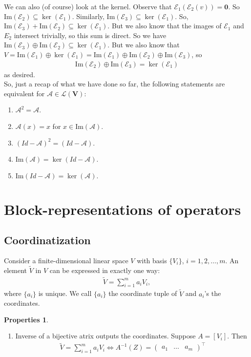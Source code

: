 \documentclass{article}
\theoremstyle{definition}
\newtheorem{prop}{Properties}[section]
\newcommand{\V}{\mathbf{V}}
\newcommand{\A}{\mathcal{A}}
\newcommand{\lag}{\mathcal{L}}
\newcommand{\E}{\mathcal{E}}
\newcommand{\ima}{\text{Im}}
\begin{document}
We can also (of course) look at the kernel. Observe that $\E_1(\E_2(v)) = \mathbf{0}$. So $\ima(\E_2) \subseteq \ker(\E_1)$. Similarly, $\ima(\E_3) \subseteq \ker(\E_1)$. So, $\ima(\E_3) + \ima(\E_2) \subseteq \ker(\E_1)$. But we also know that the images of $\E_1$ and $E_2$ intersect trivially, so this sum is direct. So we have $\ima(\E_3) \oplus \ima(\E_2) \subseteq \ker(\E_1).$ But we also know that $V = \ima(\E_1) \oplus \ker(\E_1) = \ima(\E_1) \oplus \ima(\E_2) \oplus \ima(\E_3) $, so
\begin{align*}
\ima(\E_2) \oplus \ima(\E_3) = \ker(\E_1)
\end{align*}
as desired. \\

So, just a recap of what we have done so far, the following statements are equivalent for $\mathcal{A} \in \lag(\V)$:
\begin{enumerate}
	\item $\A^2 = \A$.
	\item $\A(x) = x$ for $x\in \ima(\A)$.
	\item $(Id - \A)^2 = (Id - \A)$.
	\item $\ima(\A) = \ker(Id - \A)$.
	\item $\ima(Id - \A) = \ker(\A)$.
\end{enumerate}



\newpage
\section{Block-representations of operators}

\subsection{Coordinatization}
Consider a finite-dimensional linear space $V$ with basis $\{V_i \}$, $i=1,2,\dots,m$. An element $\tilde{V}$ in $V$ can be expressed in exactly one way:
\begin{align*}
\tilde{V} = \sum_{i=1}^m a_iV_i,
\end{align*}
where $\{ a_i\}$ is unique. We call $\{ a_i \}$ the coordinate tuple of $\tilde{V}$ and $a_i$'s the coordinates. 
\begin{prop}
	$\,$
	\begin{enumerate}
		\item Inverse of a bijective atrix outputs the coordinates. Suppose $A = [V_i]$. Then
		\begin{align*}
		\tilde{V} = \sum_{i=1}^ma_iV_i \iff A^{-1}(Z) = \begin{pmatrix}
		a_1&\dots&a_m
		\end{pmatrix}^\top
		\end{align*}
	\end{enumerate}
\end{prop}
\end{document}
